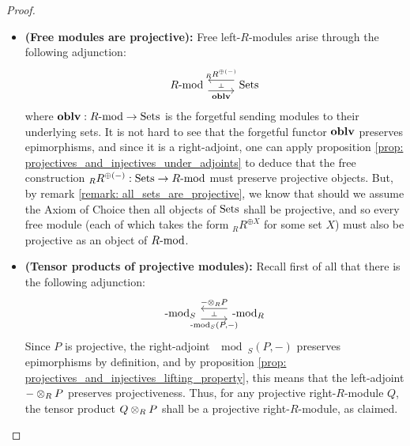                     \begin{proof}
                        \noindent
                        \begin{itemize}
                            \item \textbf{(Free modules are projective):} Free left-$R$-modules arise through the following adjunction:
                                $$
                                    \begin{tikzcd}
                                    	{R\mod} & \Sets
                                    	\arrow[""{name=0, anchor=center, inner sep=0}, "\oblv"', shift right=2, from=1-1, to=1-2]
                                    	\arrow[""{name=1, anchor=center, inner sep=0}, "{{}_RR^{\oplus (-)}}"', shift right=2, from=1-2, to=1-1]
                                    	\arrow["\dashv"{anchor=center, rotate=-90}, draw=none, from=1, to=0]
                                    \end{tikzcd}
                                $$
                            where $\oblv: R\mod \to \Sets$ is the forgetful sending modules to their underlying sets. It is not hard to see that the forgetful functor $\oblv$ preserves epimorphisms, and since it is a right-adjoint, one can apply proposition \ref{prop: projectives_and_injectives_under_adjoints} to deduce that the free construction ${}_RR^{\oplus (-)}: \Sets \to R\mod$ must preserve projective objects. But, by remark \ref{remark: all_sets_are_projective}, we know that should we assume the Axiom of Choice then all objects of $\Sets$ shall be projective, and so every free module (each of which takes the form ${}_RR^{\oplus X}$ for some set $X$) must also be projective as an object of $R\mod$.
                            \item \textbf{(Tensor products of projective modules):} Recall first of all that there is the following adjunction:
                                $$
                                   \begin{tikzcd}
                                	{\mod_S} & {\mod_R}
                                	\arrow[""{name=0, anchor=center, inner sep=0}, "{- \tensor_R P}"', shift right=2, from=1-2, to=1-1]
                                	\arrow[""{name=1, anchor=center, inner sep=0}, "{\mod_S(P, -)}"', shift right=2, from=1-1, to=1-2]
                                	\arrow["\dashv"{anchor=center, rotate=-90}, draw=none, from=0, to=1]
                                \end{tikzcd}
                                $$
                            Since $P$ is projective, the right-adjoint $\mod_S(P, -)$ preserves epimorphisms by definition, and by proposition \ref{prop: projectives_and_injectives_lifting_property}, this means that the left-adjoint $- \tensor_R P$ preserves projectiveness. Thus, for any projective right-$R$-module $Q$, the tensor product $Q \tensor_R P$ shall be a projective right-$R$-module, as claimed.
                        \end{itemize}
                    \end{proof}
                
